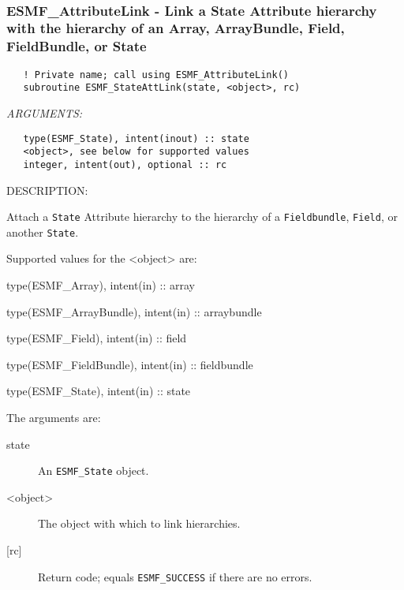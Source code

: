    
 
\mbox{}\hrulefill\ 
 
\subsubsection [ESMF\_AttributeLink] {ESMF\_AttributeLink - Link a State Attribute hierarchy with the hierarchy of an Array, ArrayBundle, Field, FieldBundle, or State}


  
\begin{verbatim}   ! Private name; call using ESMF_AttributeLink()
   subroutine ESMF_StateAttLink(state, <object>, rc)\end{verbatim}{\em ARGUMENTS:}
\begin{verbatim}   type(ESMF_State), intent(inout) :: state
   <object>, see below for supported values
   integer, intent(out), optional :: rc\end{verbatim}
{\sf DESCRIPTION:\\ }


   Attach a {\tt State} Attribute hierarchy to the hierarchy of
   a {\tt Fieldbundle}, {\tt Field}, or another {\tt State}.
  
   Supported values for the <object> are:
   \begin{description}
   \item type(ESMF\_Array), intent(in) :: array
   \item type(ESMF\_ArrayBundle), intent(in) :: arraybundle
   \item type(ESMF\_Field), intent(in) :: field
   \item type(ESMF\_FieldBundle), intent(in) :: fieldbundle
   \item type(ESMF\_State), intent(in) :: state
   \end{description}
  
   The arguments are:
   \begin{description}
   \item [state]
   An {\tt ESMF\_State} object.
   \item [<object>]
   The object with which to link hierarchies.
   \item [{[rc]}]
   Return code; equals {\tt ESMF\_SUCCESS} if there are no errors.
   \end{description}
  
   
 
